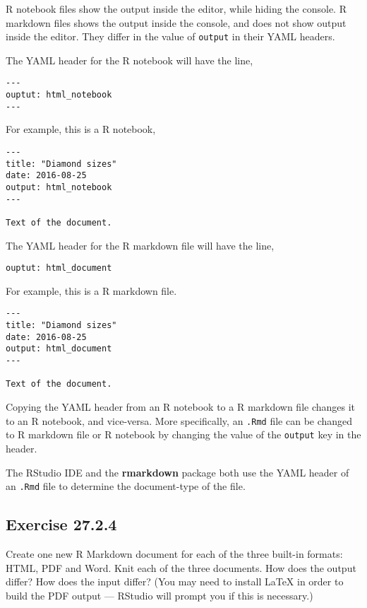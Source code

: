 \documentclass[]{book}
\theoremstyle{plain}
\theoremstyle{remark}
\theoremstyle{definition}
\theoremstyle{definition}
\theoremstyle{definition}
\theoremstyle{remark}
\begin{document}
R notebook files show the output inside the editor, while hiding the
console. R markdown files shows the output inside the console, and does
not show output inside the editor. They differ in the value of
\texttt{output} in their YAML headers.

The YAML header for the R notebook will have the line,

\begin{verbatim}
---
ouptut: html_notebook
---
\end{verbatim}

For example, this is a R notebook,

\begin{verbatim}
---
title: "Diamond sizes"
date: 2016-08-25
output: html_notebook
---

Text of the document.
\end{verbatim}

The YAML header for the R markdown file will have the line,

\begin{verbatim}
ouptut: html_document
\end{verbatim}

For example, this is a R markdown file.

\begin{verbatim}
---
title: "Diamond sizes"
date: 2016-08-25
output: html_document
---

Text of the document.
\end{verbatim}

Copying the YAML header from an R notebook to a R markdown file changes
it to an R notebook, and vice-versa. More specifically, an \texttt{.Rmd}
file can be changed to R markdown file or R notebook by changing the
value of the \texttt{output} key in the header.

The RStudio IDE and the \textbf{rmarkdown} package both use the YAML
header of an \texttt{.Rmd} file to determine the document-type of the
file.

\hypertarget{exercise-27.2.4}{%
\subsection*{\texorpdfstring{Exercise
{27.2.4}}{Exercise 27.2.4}}\label{exercise-27.2.4}}

Create one new R Markdown document for each of the three built-in
formats: HTML, PDF and Word. Knit each of the three documents. How does
the output differ? How does the input differ? (You may need to install
LaTeX in order to build the PDF output --- RStudio will prompt you if
this is necessary.)
\end{document}
